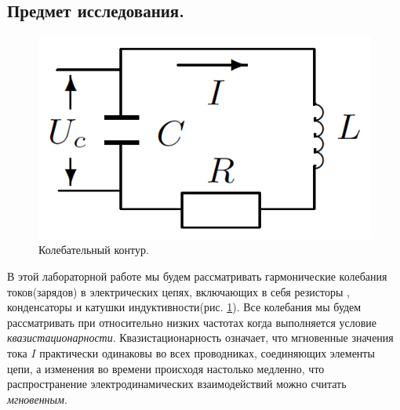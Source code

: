 \documentclass[a4paper, 12pt, twoside]{article}
\begin{document}
\subsection{Предмет исследования.}
\begin{figure}
	\includegraphics[width = \linewidth]{RLC}
	\caption{Колебательный контур.}
	\label{RLC}
\end{figure}
В этой лабораторной работе мы будем рассматривать гармонические колебания токов(зарядов) в электрических цепях, включающих в себя резисторы , конденсаторы и катушки индуктивности(рис. \ref{RLC}). Все колебания мы будем рассматривать при относительно низких частотах когда выполняется условие {\textit{квазистационарности}}. Квазистационарность означает, что мгновенные значения тока $I$ практически одинаковы во всех проводниках, соединяющих элементы цепи, а изменения во времени происходя настолько медленно, что распространение электродинамических взаимодействий можно считать \textit{мгновенным}.
\end{document}

